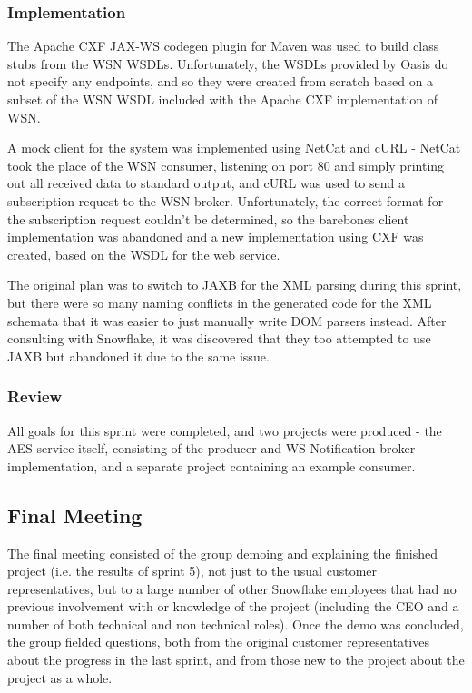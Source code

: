 \documentclass[a4paper, 12pt, twoside]{article}
\begin{document}
\subsubsection{Implementation}

The Apache CXF JAX-WS codegen plugin for Maven was used to build class stubs from the WSN WSDLs. Unfortunately, the WSDLs provided by Oasis do not specify any endpoints, and so they were created from scratch based on a subset of the WSN WSDL included with the Apache CXF implementation of WSN.

A mock client for the system was implemented using NetCat and cURL - NetCat took the place of the WSN consumer, listening on port 80 and simply printing out all received data to standard output, and cURL was used to send a subscription request to the WSN broker. Unfortunately, the correct format for the subscription request couldn't be determined, so the barebones client implementation was abandoned and a new implementation using CXF was created, based on the WSDL for the web service.

The original plan was to switch to JAXB for the XML parsing during this sprint, but there were so many naming conflicts in the generated code for the XML schemata that it was easier to just manually write DOM parsers instead. After consulting with Snowflake, it was discovered that they too attempted to use JAXB but abandoned it due to the same issue.

\subsubsection{Review}

All goals for this sprint were completed, and two projects were produced - the AES service itself, consisting of the producer and WS-Notification broker implementation, and a separate project containing an example consumer.

\subsection{Final Meeting}
\label{sec:impl_final_meeting}

The final meeting consisted of the group demoing and explaining the finished project (i.e. the results of sprint 5), not just to the usual customer representatives, but to a large number of other Snowflake employees that had no previous involvement with or knowledge of the project (including the CEO and a number of both technical and non technical roles). Once the demo was concluded, the group fielded questions, both from the original customer representatives about the progress in the last sprint, and from those new to the project about the project as a whole.
\end{document}

